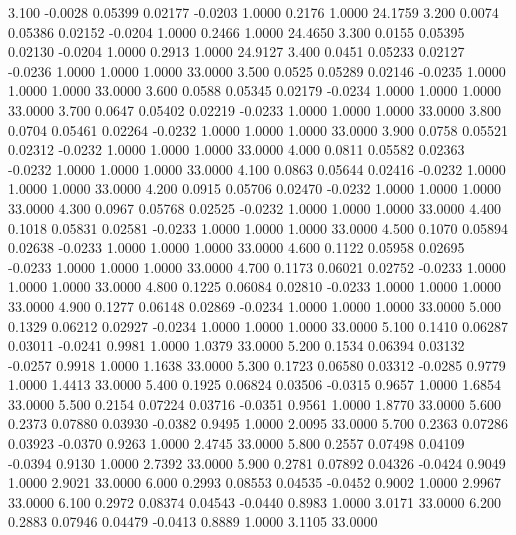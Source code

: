    3.100  -0.0028   0.05399   0.02177  -0.0203   1.0000   0.2176   1.0000  24.1759
   3.200   0.0074   0.05386   0.02152  -0.0204   1.0000   0.2466   1.0000  24.4650
   3.300   0.0155   0.05395   0.02130  -0.0204   1.0000   0.2913   1.0000  24.9127
   3.400   0.0451   0.05233   0.02127  -0.0236   1.0000   1.0000   1.0000  33.0000
   3.500   0.0525   0.05289   0.02146  -0.0235   1.0000   1.0000   1.0000  33.0000
   3.600   0.0588   0.05345   0.02179  -0.0234   1.0000   1.0000   1.0000  33.0000
   3.700   0.0647   0.05402   0.02219  -0.0233   1.0000   1.0000   1.0000  33.0000
   3.800   0.0704   0.05461   0.02264  -0.0232   1.0000   1.0000   1.0000  33.0000
   3.900   0.0758   0.05521   0.02312  -0.0232   1.0000   1.0000   1.0000  33.0000
   4.000   0.0811   0.05582   0.02363  -0.0232   1.0000   1.0000   1.0000  33.0000
   4.100   0.0863   0.05644   0.02416  -0.0232   1.0000   1.0000   1.0000  33.0000
   4.200   0.0915   0.05706   0.02470  -0.0232   1.0000   1.0000   1.0000  33.0000
   4.300   0.0967   0.05768   0.02525  -0.0232   1.0000   1.0000   1.0000  33.0000
   4.400   0.1018   0.05831   0.02581  -0.0233   1.0000   1.0000   1.0000  33.0000
   4.500   0.1070   0.05894   0.02638  -0.0233   1.0000   1.0000   1.0000  33.0000
   4.600   0.1122   0.05958   0.02695  -0.0233   1.0000   1.0000   1.0000  33.0000
   4.700   0.1173   0.06021   0.02752  -0.0233   1.0000   1.0000   1.0000  33.0000
   4.800   0.1225   0.06084   0.02810  -0.0233   1.0000   1.0000   1.0000  33.0000
   4.900   0.1277   0.06148   0.02869  -0.0234   1.0000   1.0000   1.0000  33.0000
   5.000   0.1329   0.06212   0.02927  -0.0234   1.0000   1.0000   1.0000  33.0000
   5.100   0.1410   0.06287   0.03011  -0.0241   0.9981   1.0000   1.0379  33.0000
   5.200   0.1534   0.06394   0.03132  -0.0257   0.9918   1.0000   1.1638  33.0000
   5.300   0.1723   0.06580   0.03312  -0.0285   0.9779   1.0000   1.4413  33.0000
   5.400   0.1925   0.06824   0.03506  -0.0315   0.9657   1.0000   1.6854  33.0000
   5.500   0.2154   0.07224   0.03716  -0.0351   0.9561   1.0000   1.8770  33.0000
   5.600   0.2373   0.07880   0.03930  -0.0382   0.9495   1.0000   2.0095  33.0000
   5.700   0.2363   0.07286   0.03923  -0.0370   0.9263   1.0000   2.4745  33.0000
   5.800   0.2557   0.07498   0.04109  -0.0394   0.9130   1.0000   2.7392  33.0000
   5.900   0.2781   0.07892   0.04326  -0.0424   0.9049   1.0000   2.9021  33.0000
   6.000   0.2993   0.08553   0.04535  -0.0452   0.9002   1.0000   2.9967  33.0000
   6.100   0.2972   0.08374   0.04543  -0.0440   0.8983   1.0000   3.0171  33.0000
   6.200   0.2883   0.07946   0.04479  -0.0413   0.8889   1.0000   3.1105  33.0000
